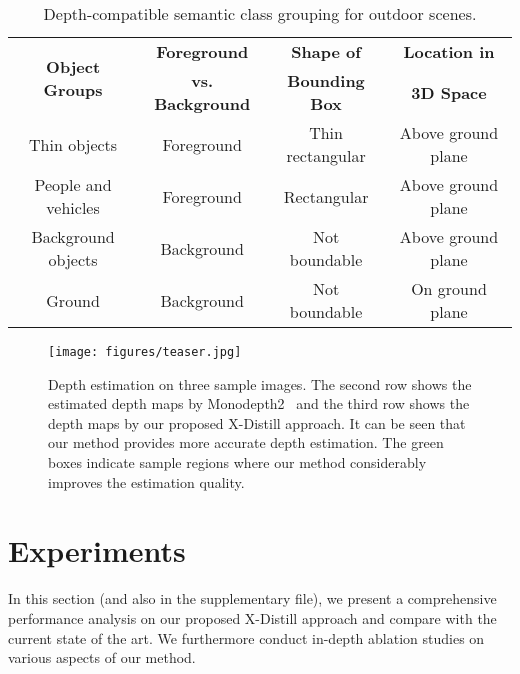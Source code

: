 \documentclass{bmvc2k}
\begin{document}
\begin{table}[t!]
\centering
\footnotesize
\begin{tabular}[h]{ c | c | c | c }
\hline
\multirow{2}{*}{\textbf{Object Groups}} &{\textbf{Foreground}} &{\bf Shape of} &{\bf Location in} \\
& {\bf vs. Background} &{\bf Bounding Box} & {\bf 3D Space} \\
\hline
Thin objects      &Foreground     &Thin rectangular   &Above ground plane\\ \hline
People and vehicles &Foreground     &Rectangular        &Above ground plane\\ \hline
Background objects  &Background     &Not boundable      &Above ground plane\\ \hline
Ground              &Background     &Not boundable      &On ground plane\\
\hline
\end{tabular}
\vspace{2pt}
\caption{\small Depth-compatible semantic class grouping for outdoor scenes.}
\label{tab:categorization}
\vspace{-15pt}
\end{table}
 
 
\begin{figure}[b!]
\vspace{-10pt}
\centering
\texttt{[image: figures/teaser.jpg]}
\vspace{-10pt}
\caption{\small Depth estimation on three sample images. The second row shows the estimated depth maps by Monodepth2~\cite{godard2019digging} and the third row shows the depth maps by our proposed X-Distill approach. It can be seen that our method provides more accurate depth estimation. The green boxes indicate sample regions where our method considerably improves the estimation quality.} \label{fig:sample results}
\vspace{-0pt}
\end{figure} 
 
\vspace{-10pt}
\section{Experiments}\label{sec:exp}
\vspace{-5pt}
In this section (and also in the supplementary file), we present a  comprehensive performance analysis on our proposed X-Distill approach and compare with the current state of the art. We furthermore conduct in-depth ablation studies on various aspects of our method.
\end{document}
